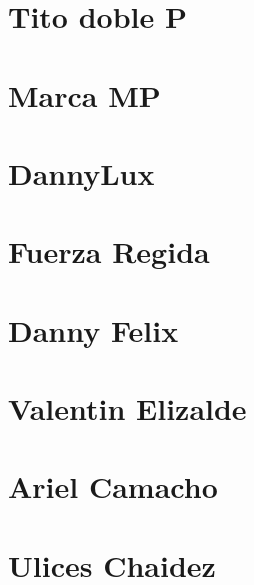 \documentclass{article}
\begin{document}
\section{Tito doble P}



\section{Marca MP}


\section{DannyLux}


\section{Fuerza Regida}







\section{Danny Felix}

\section{Valentin Elizalde}


\section{Ariel Camacho}



\section{Ulices Chaidez}

\end{document}
